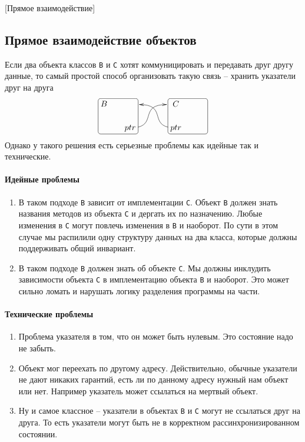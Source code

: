 [Прямое взаимодействие]


\subsection{Прямое взаимодействие объектов}

Если два объекта классов \verb"B" и \verb"C" хотят коммуницировать и передавать друг другу данные, то самый простой способ организовать такую связь -- хранить указатели друг на друга
\[
\xymatrix@R=15pt@C=15pt{
	{B}
	{
	\save
   [].[rd]*[F-:<3pt>]\frm{}
   \restore
	}
	&{}&{}&{C}
	&{\phantom{C}}\\
	{}&{ptr}\ar@(r, l)[rru]+(-4,0)&{}&{ptr}
	{
	\save
   [].[ru]*[F-:<3pt>]\frm{}
   \restore
	}
	\ar@(l,r)[ull]+(4,0)&{}\\
}
\]
Однако у такого решения есть серьезные проблемы как идейные так и технические.

\paragraph{Идейные проблемы}
\begin{enumerate}
\item В таком подходе \verb"B" зависит от имплементации \verb"C".
Объект \verb"B" должен знать названия методов из объекта \verb"C" и дергать их по назначению.
Любые изменения в \verb"C" могут повлечь изменения в \verb"B" и наоборот.
По сути в этом случае мы распилили одну структуру данных на два класса, которые должны поддерживать общий инвариант.

\item В таком подходе \verb"B" должен знать об объекте \verb"C".
Мы должны инклудить зависимости объекта \verb"C" в имплементацию объекта \verb"B" и наоборот.
Это может сильно ломать и нарушать логику разделения программы на части.
\end{enumerate}

\paragraph{Технические проблемы}
\begin{enumerate}
\item Проблема указателя в том, что он может быть нулевым.
Это состояние надо не забыть.

\item Объект мог переехать по другому адресу.
Действительно, обычные указатели не дают никаких гарантий, есть ли по данному адресу нужный нам объект или нет.
Например указатель может ссылаться на мертвый объект.

\item Ну и самое классное -- указатели в объектах \verb"B" и \verb"C" могут не ссылаться друг на друга.
То есть указатели могут быть не в корректном рассинхронизированном состоянии.
\end{enumerate}
